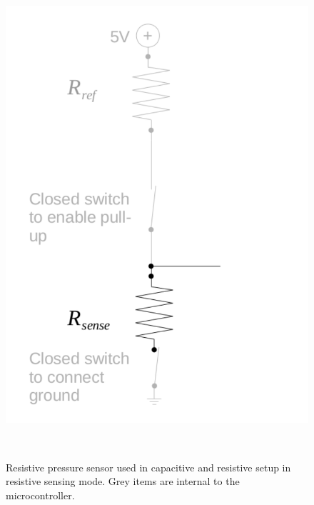\documentclass{sigchi}
\begin{document}
\begin{figure}
\centering
  \includegraphics[width=0.9\columnwidth]{figures/cap_res_setup_res}
  \caption{Resistive pressure sensor used in capacitive and resistive setup in
resistive sensing mode. Grey items are internal to the
microcontroller.}~\label{fig:cap_res_setup_res}
\end{figure}
\end{document}
